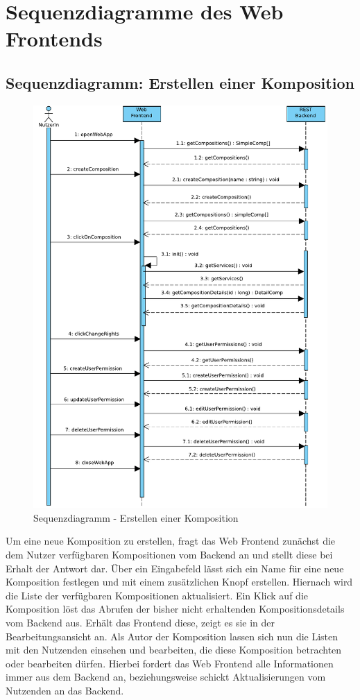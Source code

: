 \newpage
\section*{Sequenzdiagramme des Web Frontends}
\subsection*{Sequenzdiagramm: Erstellen einer Komposition}

\begin{figure}[!h]
	\centering
	\includegraphics[width=.5\textwidth]{img/Diagramme/Sequenz/Frontend_createComp}
			
	\caption{Sequenzdiagramm - Erstellen einer Komposition}
	\label{fig:sequenz-createComp}
\end{figure}

\noindent
Um eine neue Komposition zu erstellen, fragt das Web Frontend zunächst die dem Nutzer verfügbaren Kompositionen vom Backend an und stellt diese bei Erhalt der Antwort dar. Über ein Eingabefeld lässt sich ein Name für eine neue Komposition festlegen und mit einem zusätzlichen Knopf erstellen. Hiernach wird die Liste der verfügbaren Kompositionen aktualisiert. Ein Klick auf die Komposition löst das Abrufen der bisher nicht erhaltenden Kompositionsdetails vom Backend aus. Erhält das Frontend diese, zeigt es sie in der Bearbeitungsansicht an. Als Autor der Komposition lassen sich nun die Listen mit den Nutzenden einsehen und bearbeiten, die diese Komposition betrachten oder bearbeiten dürfen. Hierbei fordert das Web Frontend alle Informationen immer aus dem Backend an, beziehungsweise schickt Aktualisierungen vom Nutzenden an das Backend.

